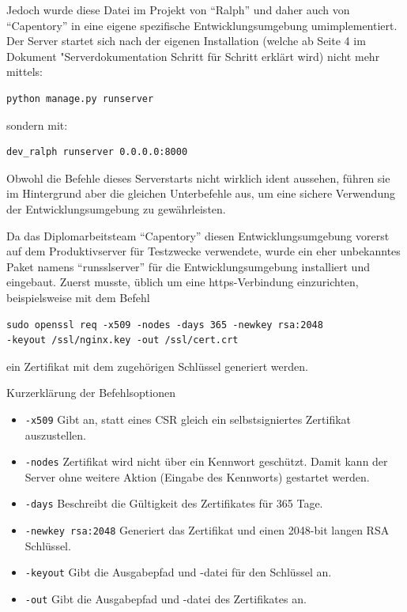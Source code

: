 Jedoch wurde diese Datei im Projekt von ``Ralph'' und daher auch von
``Capentory'' in eine eigene spezifische Entwicklungsumgebung
umimplementiert. Der Server startet sich nach der eigenen Installation
(welche ab Seite 4 im Dokument "Serverdokumentation Schritt für Schritt
erklärt wird) nicht mehr mittels:

\begin{verbatim}
python manage.py runserver
\end{verbatim}

sondern mit:

\begin{verbatim}
dev_ralph runserver 0.0.0.0:8000
\end{verbatim}

Obwohl die Befehle dieses Serverstarts nicht wirklich ident aussehen,
führen sie im Hintergrund aber die gleichen Unterbefehle aus, um eine
sichere Verwendung der Entwicklungsumgebung zu gewährleisten.

Da das Diplomarbeitsteam ``Capentory'' diesen Entwicklungsumgebung
vorerst auf dem Produktivserver für Testzwecke verwendete, wurde ein
eher unbekanntes Paket namens ``runsslserver'' für die
Entwicklungsumgebung installiert und eingebaut. Zuerst musste, üblich um
eine https-Verbindung einzurichten, beispielsweise mit dem Befehl

\begin{verbatim}
sudo openssl req -x509 -nodes -days 365 -newkey rsa:2048 
-keyout /ssl/nginx.key -out /ssl/cert.crt
\end{verbatim}

ein Zertifikat mit dem zugehörigen Schlüssel generiert werden.

Kurzerklärung der Befehlsoptionen

\begin{itemize}
\tightlist
\item
  \texttt{-x509} Gibt an, statt eines CSR gleich ein selbstsigniertes
  Zertifikat auszustellen.
\item
  \texttt{-nodes} Zertifikat wird nicht über ein Kennwort geschützt.
  Damit kann der Server ohne weitere Aktion (Eingabe des Kennworts)
  gestartet werden.
\item
  \texttt{-days} Beschreibt die Gültigkeit des Zertifikates für 365
  Tage.
\item
  \texttt{-newkey\ rsa:2048} Generiert das Zertifikat und einen 2048-bit
  langen RSA Schlüssel.
\item
  \texttt{-keyout} Gibt die Ausgabepfad und -datei für den Schlüssel an.
\item
  \texttt{-out} Gibt die Ausgabepfad und -datei des Zertifikates an.
\end{itemize}

